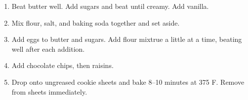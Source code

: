 
\begin{ingredients}
\end{ingredients}


\begin{recipe}
  \begin{enumerate}
  \item Beat butter well.  Add sugars and beat until creamy.  Add vanilla.

  \item Mix flour, salt, and baking soda together and set aside.

  \item Add eggs to butter and sugars.  Add flour mixtrue a little at
  a time, beating well after each addition.

\item Add chocolate chips, then raisins.

\item Drop onto ungreased cookie sheets and bake 8--10 minutes at 375
  F.   Remove from sheets immediately.

  \end{enumerate}
\end{recipe}
